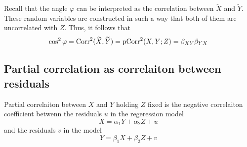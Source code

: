 Recall that the angle $\varphi$ can be interpreted as the correlation
between $\widetilde X$ and $\widetilde Y$.
These random variables are constructed in such a way that both of them
are uncorrelated with $Z$. Thus, it follows that
\[
\cos^2 \varphi = \operatorname{Corr}^2(\widetilde X, \widetilde Y) = \operatorname{pCorr}^2(X,Y; Z) = \beta_{XY} \beta_{YX}
\]

\subsection{Partial correlation as correlaiton between residuals}




\begin{theorem}
Partial correlaiton between $X$ and $Y$ holding $Z$ fixed is the negative
correlaiton coefficient betwenn the residuals $u$ in the regeression model
\[
X = \alpha_1 Y + \alpha_2 Z + u
\]
and the residuals $v$ in the model
\[
Y = \beta_1 X + \beta_2 Z + v
\]
\end{theorem}

